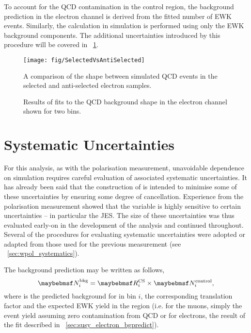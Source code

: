 To account for the \ac{QCD} contamination in the control region, the background
prediction in the electron channel is derived from the fitted number of \ac{EWK}
events. Similarly, the \RCS calculation in simulation is performed using only
the \ac{EWK} background components. The additional uncertainties introduced by
this procedure will be covered in \sec~\ref{sec:susy_systematics}.


\begin{figure}[h!]
\centering
\texttt{[image: fig/SelectedVsAntiSelected]}
\caption[\ac{MC} \LP shape comparison between selected and anti-selected
\ac{QCD} events]{A comparison of the \LP shape between simulated \ac{QCD} events
  in the selected and anti-selected electron samples.}
\label{fig:susy_elqcd_selasel}
\end{figure}


\begin{figure}[h!]
\centering
{}\quad
{}
\caption[Results of fits to the \ac{QCD} background shape in the electron
channel]{Results of fits to the \ac{QCD} background shape in the electron
  channel shown for two \STlep bins.}
\label{fig:susy_elqcd}
\end{figure}

\section{Systematic Uncertainties}
\label{sec:susy_systematics}
For this analysis, as with the \PW polarisation measurement, unavoidable
dependence on simulation requires careful evaluation of associated systematic
uncertainties. It has already been said that the construction of \RCS is
intended to minimise some of these uncertainties by ensuring some degree of
cancellation. Experience from the \PW polarisation measurement showed that the
\LP variable is highly sensitive to certain uncertainties -- in particular the
\ac{JES}. The size of these uncertainties was thus evaluated early-on in the
development of the analysis and continued throughout. Several of the procedures
for evaluating systematic uncertainties were adopted or adapted from those used
for the previous measurement (see \sec~\ref{sec:wpol_systematics}).

The background prediction may be written as follows,
\begin{equation*}
\NBkgi = \RCSi \times \NControli,
\end{equation*}
where \NBkgi is the predicted background for \LPsignal in \STlep bin $i$, \RCSi
the corresponding translation factor and \NControli the expected \ac{EWK} yield
in the region \LPcontrol (i.e. for the muons, simply the event yield assuming
zero contamination from \ac{QCD} or for electrons, the result of the fit
described in \sec~\ref{sec:susy_electron_bgpredict}).

